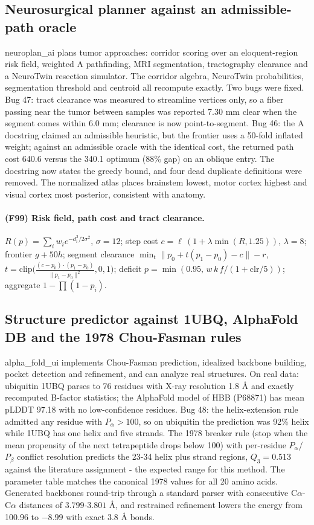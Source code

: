 \subsection{Neurosurgical planner against an admissible-path oracle}
neuroplan\_ai plans tumor approaches: corridor scoring over an eloquent-region risk field, weighted A\* pathfinding, MRI segmentation, tractography clearance and a NeuroTwin resection simulator. The corridor algebra, NeuroTwin probabilities, segmentation threshold and centroid all recompute exactly. Two bugs were fixed. Bug 47: tract clearance was measured to streamline vertices only, so a fiber passing near the tumor between samples was reported 7.30 mm clear when the segment comes within 6.0 mm; clearance is now point-to-segment. Bug 46: the A\* docstring claimed an admissible heuristic, but the frontier uses a 50-fold inflated weight; against an admissible oracle with the identical cost, the returned path cost 640.6 versus the 340.1 optimum (88\% gap) on an oblique entry. The docstring now states the greedy bound, and four dead duplicate definitions were removed. The normalized atlas places brainstem lowest, motor cortex highest and visual cortex most posterior, consistent with anatomy.
\paragraph{(F99) Risk field, path cost and tract clearance.} $R(p)=\sum_i w_i e^{-d_i^2/2\sigma^2}$, $\sigma=12$; step cost $c=\ell\,(1+\lambda\min(R,1.25))$, $\lambda=8$; frontier $g+50h$; segment clearance $\min_t\|p_0+t(p_1-p_0)-c\|-r$, $t=\mathrm{clip}\!\big(\frac{(c-p_0)\cdot(p_1-p_0)}{\|p_1-p_0\|^2},0,1\big)$; deficit $p=\min(0.95,\,w\,k\,f/(1+\mathrm{clr}/5))$; aggregate $1-\prod(1-p_i)$.
\subsection{Structure predictor against 1UBQ, AlphaFold DB and the 1978 Chou-Fasman rules}
alpha\_fold\_ui implements Chou-Fasman prediction, idealized backbone building, pocket detection and refinement, and can analyze real structures. On real data: ubiquitin 1UBQ parses to 76 residues with X-ray resolution 1.8 \AA{} and exactly recomputed B-factor statistics; the AlphaFold model of HBB (P68871) has mean pLDDT 97.18 with no low-confidence residues. Bug 48: the helix-extension rule admitted any residue with $P_\alpha>100$, so on ubiquitin the prediction was 92\% helix while 1UBQ has one helix and five strands. The 1978 breaker rule (stop when the mean propensity of the next tetrapeptide drops below 100) with per-residue $P_\alpha$/$P_\beta$ conflict resolution predicts the 23-34 helix plus strand regions, $Q_3=0.513$ against the literature assignment - the expected range for this method. The parameter table matches the canonical 1978 values for all 20 amino acids. Generated backbones round-trip through a standard parser with consecutive C$\alpha$-C$\alpha$ distances of $3.799$-$3.801$ \AA{}, and restrained refinement lowers the energy from 100.96 to $-8.99$ with exact 3.8 \AA{} bonds.
